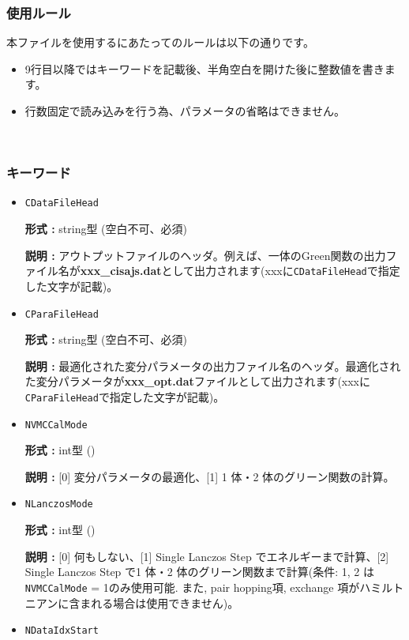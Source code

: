 \subsubsection{使用ルール}
本ファイルを使用するにあたってのルールは以下の通りです。
\begin{itemize}
\item 9行目以降ではキーワードを記載後、半角空白を開けた後に整数値を書きます。
\item 行数固定で読み込みを行う為、パラメータの省略はできません。
\end{itemize}

~\subsubsection{キーワード}
 \begin{itemize}
  \item  \verb|CDataFileHead|

 {\bf 形式 :} string型 (空白不可、必須)

{\bf 説明 :} アウトプットファイルのヘッダ。例えば、一体のGreen関数の出力ファイル名が{\bf xxx\_cisajs.dat}として出力されます(xxxに\verb|CDataFileHead|で指定した文字が記載)。

 \item  \verb|CParaFileHead|

 {\bf 形式 :} string型 (空白不可、必須)

{\bf 説明 :} 最適化された変分パラメータの出力ファイル名のヘッダ。最適化された変分パラメータが{\bf xxx\_opt.dat}ファイルとして出力されます(xxxに\verb|CParaFileHead|で指定した文字が記載)。
 
 
 \item  \verb|NVMCCalMode|

 {\bf 形式 :} int型 ()

{\bf 説明 :} [0] 変分パラメータの最適化、[1] 1 体・2 体のグリーン関数の計算。
 
 \item  \verb|NLanczosMode|

 {\bf 形式 :} int型 ()

{\bf 説明 :} [0] 何もしない、[1] Single Lanczos Step でエネルギーまで計算、[2] Single Lanczos Step で1 体・2 体のグリーン関数まで計算(条件: 1, 2 は\verb|NVMCCalMode| = 1のみ使用可能. また, pair hopping項, exchange 項がハミルトニアンに含まれる場合は使用できません)。
 
 \item  \verb|NDataIdxStart|


\end{itemize}
